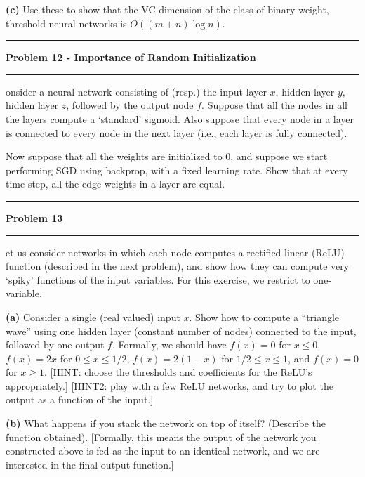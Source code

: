 \documentclass[11pt]{article}
\newcommand\question[2]{\vspace{.25in}\hrule\textbf{#1}\vspace{.5em}\hrule\vspace{.10in}}
\renewcommand\part[1]{\vspace{.10in}\textbf{(#1)}}
\begin{document}
\part{c} Use these to show that the VC dimension of the class of binary-weight, threshold neural networks is $O((m+n)\log ⁡n)$.


\question{Problem 12 - Importance of Random Initialization}

Consider a neural network consisting of (resp.) the input layer $x$, hidden layer $y$, hidden layer $z$, followed by the output node $f$. Suppose that all the nodes in all the layers compute a `standard' sigmoid. Also suppose that every node in a layer is connected to every node in the next layer (i.e., each layer is fully connected).

Now suppose that all the weights are initialized to 0, and suppose we start performing SGD using backprop, with a fixed learning rate. Show that at every time step, all the edge weights in a layer are equal.


\question{Problem 13}

Let us consider networks in which each node computes a rectified linear (ReLU) function (described in the next problem), and show how they can compute very `spiky' functions of the input variables. For this exercise, we restrict to one-variable.

\part{a} Consider a single (real valued) input $x$. Show how to compute a ``triangle wave'' using one hidden layer (constant number of nodes) connected to the input, followed by one output $f$. Formally, we should have $f(x) = 0$ for $x \leq 0$, $f(x) = 2x$ for $0 \leq x \leq 1/2$, $f(x) = 2(1 - x)$ for $1/2 \leq x \leq 1$, and $f(x) = 0$ for $x \geq 1$. [HINT: choose the thresholds and coefficients for the ReLU's appropriately.] [HINT2: play with a few ReLU networks, and try to plot the output as a function of the input.]


\part{b} What happens if you stack the network on top of itself? (Describe the function obtained). [Formally, this means the output of the network you constructed above is fed as the input to an identical network, and we are interested in the final output function.]
\end{document}
